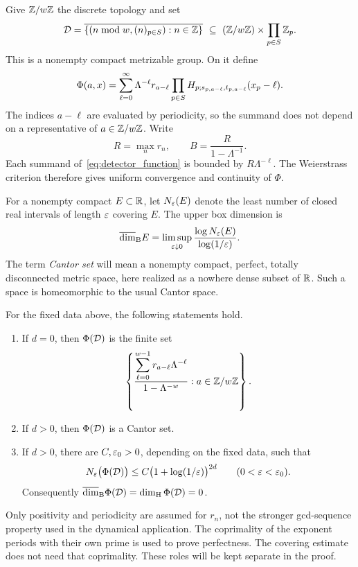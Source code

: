 Give $\mathbb Z/w\mathbb Z$ the discrete topology and set
\begin{equation}\label{eq:detector_definition}
 \mathcal D=\overline{\{(n\bmod w,(n)_{p\in S}):n\in\mathbb Z\}}
 \ \subseteq\ (\mathbb Z/w\mathbb Z)\times\prod_{p\in S}\mathbb Z_p.
\end{equation}
This is a nonempty compact metrizable group. On it define
\begin{equation}\label{eq:detector_function}
 \Phi(a,x)=\sum_{\ell=0}^{\infty}\Lambda^{-\ell}r_{a-\ell}
       \prod_{p\in S}H_{p;s_{p,a-\ell},t_{p,a-\ell}}(x_p-\ell).
\end{equation}
The indices $a-\ell$ are evaluated by periodicity, so the summand does not
depend on a representative of $a\in\mathbb Z/w\mathbb Z$. Write
\begin{equation}\label{eq:RB}
 R=\max_n r_n,\qquad B=\frac{R}{1-\Lambda^{-1}}.
\end{equation}
Each summand of~\eqref{eq:detector_function} is bounded by
$R\Lambda^{-\ell}$. The Weierstrass criterion therefore gives uniform
convergence and continuity of $\Phi$.

For a nonempty compact $E\subset\mathbb R$, let $N_{\varepsilon}(E)$ denote the least
number of closed real intervals of length $\varepsilon$ covering $E$. The upper
box dimension is
\begin{equation}\label{eq:box_definition}
 \overline{\dim}_{\mathrm B} E=\limsup_{\varepsilon\downarrow0}
          \frac{\log N_{\varepsilon}(E)}{\log(1/\varepsilon)}.
\end{equation}
The term \emph{Cantor set} will mean a nonempty compact, perfect,
totally disconnected metric space, here realized as a nowhere dense subset
of $\mathbb R$. Such a space is homeomorphic to the usual Cantor space.

\begin{theorem}\label{thm:image}
For the fixed data above, the following statements hold.
\begin{enumerate}
 \item If $d=0$, then $\Phi(\mathcal D)$ is the finite set
 \begin{equation}\label{eq:finite_image}
  \left\{\frac{\displaystyle\sum_{\ell=0}^{w-1}
              r_{a-\ell}\Lambda^{-\ell}}
             {1-\Lambda^{-w}}:a\in\mathbb Z/w\mathbb Z\right\}.
 \end{equation}
 \item If $d>0$, then $\Phi(\mathcal D)$ is a Cantor set.
 \item If $d>0$, there are $C,\varepsilon_0>0$, depending on the fixed data,
 such that
 \begin{equation}\label{eq:main_cover}
  N_{\varepsilon}\bigl(\Phi(\mathcal D)\bigr)
   \leq C\bigl(1+\log(1/\varepsilon)\bigr)^{2d}
   \qquad(0<\varepsilon<\varepsilon_0).
 \end{equation}
 Consequently $\overline{\dim}_{\mathrm B}\Phi(\mathcal D)=\dim_{\mathrm H}\Phi(\mathcal D)=0$.
\end{enumerate}
\end{theorem}

Only positivity and periodicity are assumed for $r_n$, not the stronger
gcd-sequence property used in the dynamical application. The coprimality
of the exponent periods with their own prime is used to prove perfectness.
The covering estimate does not need that coprimality. These roles will be
kept separate in the proof.
